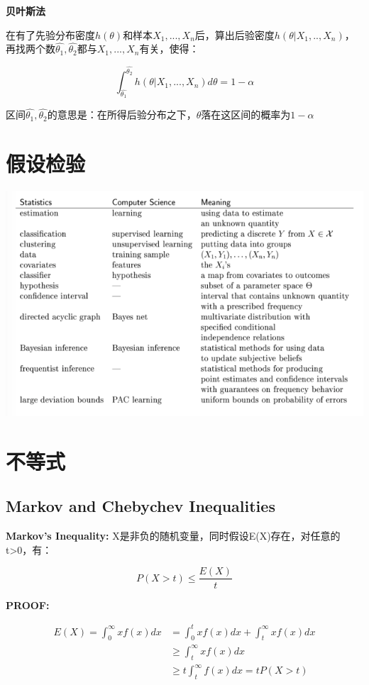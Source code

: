 \documentclass{ctexart}
\begin{document}
	\textbf{贝叶斯法}
	
	在有了先验分布密度\(h(\theta)\)和样本\(X_1,...,X_n\)后，算出后验密度\(h(\theta|X_1,..,X_n)\)，再找两个数\(\hat{\theta_1}, \hat{\theta_2}\)都与\(X_1,...,X_n\)有关，使得：
	
	\[\int_{\hat{\theta_1}}^{\hat{\theta_2}}h(\theta|X_1,...,X_n)d\theta = 1-\alpha\]
	
	区间\(\hat{\theta_1}, \hat{\theta_2}\)的意思是：在所得后验分布之下，\(\theta\)落在这区间的概率为\(1-\alpha\)
	
	\section{假设检验}
	
	
	
	
	
	\includegraphics[width=0.8\linewidth]{pic/statistics_data_mining_dict}
	
	\section{不等式}
	
	\subsection{Markov and Chebychev Inequalities}
	
	\textbf{Markov's Inequality:}
	X是非负的随机变量，同时假设E(X)存在，对任意的t>0，有：
	
	\[P(X> t) \leq \frac{E(X)}{t}\]
	
	\textbf{PROOF:}
	
	\begin{align*}
	E(X)=\int_{0}^{\infty}xf(x)dx& =\int_{0}^{t}xf(x)dx+\int_{t}^{\infty}xf(x)dx \\
	 & \geq \int_{t}^{\infty}xf(x)dx \\
	 & \geq t\int_{t}^{\infty}f(x)dx = tP(X>t)
	\end{align*}
	
\end{document}
